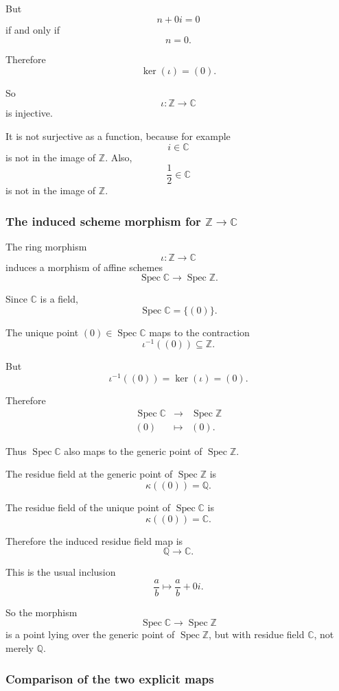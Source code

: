 \documentclass[12pt,a4paper]{article}
\DeclareMathOperator{\Spec}{Spec}
\theoremstyle{notespace}
\begin{document}
But
\[
n+0i=0
\]
if and only if
\[
n=0.
\]

Therefore
\[
\ker(\iota)=(0).
\]

So
\[
\iota:\mathbb Z\to\mathbb C
\]
is injective.

It is not surjective as a function, because for example
\[
i\in\mathbb C
\]
is not in the image of \(\mathbb Z\). Also,
\[
\frac12\in\mathbb C
\]
is not in the image of \(\mathbb Z\).

\subsubsection*{The induced scheme morphism for \texorpdfstring{\(\mathbb Z\to\mathbb C\)}{Z to C}}

The ring morphism
\[
\iota:\mathbb Z\to\mathbb C
\]
induces a morphism of affine schemes
\[
\Spec\mathbb C\longrightarrow \Spec\mathbb Z.
\]

Since \(\mathbb C\) is a field,
\[
\Spec\mathbb C=\{(0)\}.
\]

The unique point \((0)\in\Spec\mathbb C\) maps to the contraction
\[
\iota^{-1}((0))\subseteq\mathbb Z.
\]

But
\[
\iota^{-1}((0))=\ker(\iota)=(0).
\]

Therefore
\[
\begin{array}{ccc}
	\Spec\mathbb C & \longrightarrow & \Spec\mathbb Z
	\\[4pt]
	(0) & \longmapsto & (0).
\end{array}
\]

Thus \(\Spec\mathbb C\) also maps to the generic point of \(\Spec\mathbb Z\).

The residue field at the generic point of \(\Spec\mathbb Z\) is
\[
\kappa((0))=\mathbb Q.
\]

The residue field of the unique point of \(\Spec\mathbb C\) is
\[
\kappa((0))=\mathbb C.
\]

Therefore the induced residue field map is
\[
\mathbb Q\longrightarrow \mathbb C.
\]

This is the usual inclusion
\[
\frac{a}{b}\longmapsto \frac{a}{b}+0i.
\]

So the morphism
\[
\Spec\mathbb C\to\Spec\mathbb Z
\]
is a point lying over the generic point of \(\Spec\mathbb Z\), but with residue field \(\mathbb C\), not merely \(\mathbb Q\).

\subsubsection*{Comparison of the two explicit maps}
\end{document}
